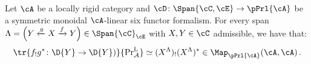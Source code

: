 \begin{prop}\label{thm:categorical-fixed-pts}
Let $\cA$ be a locally rigid category and $\cD\colon \Span{\cC,\cE}\to \pPrl{\cA}$ be a symmetric monoidal $\cA$-linear six functor
formalism.
For every span $\Lambda=\left(Y\xleftarrow{g}X \xrightarrow{f} Y\right)\in \Span{\cC}_{\cE}$ with $X,Y\in \cC$ admissible, we have that:
  \begin{equation}
    \label{eq:categorical-trace-formula}
    \tr{f_!g^*\colon \D{Y}\to \D{Y})}{\mathrm{Pr}^{\mathrm{L}}_{\mathcal A}}\simeq (X^\Lambda)_!(X^\Lambda)^* \in \Map_{\pPrl{\cA}}(\cA,\cA)\,.
  \end{equation}
\end{prop}
